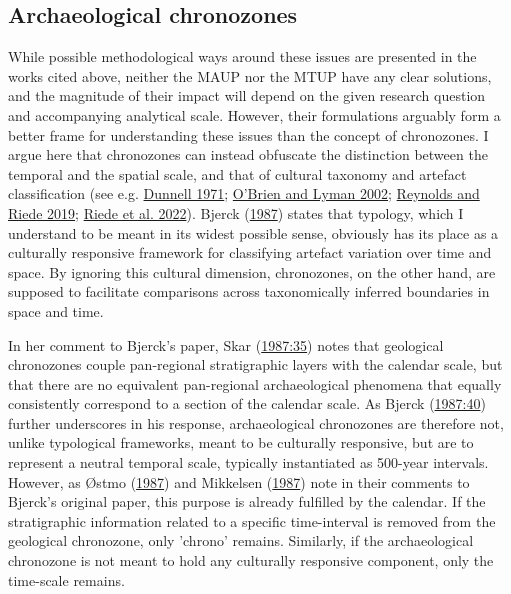\documentclass[
  12pt,
  a4paper,
  oneside]{book}
\begin{document}
\hypertarget{archaeological-chronozones}{%
\subsection{Archaeological chronozones}\label{archaeological-chronozones}}

While possible methodological ways around these issues are presented in the works cited above, neither the MAUP nor the MTUP have any clear solutions, and the magnitude of their impact will depend on the given research question and accompanying analytical scale. However, their formulations arguably form a better frame for understanding these issues than the concept of chronozones. I argue here that chronozones can instead obfuscate the distinction between the temporal and the spatial scale, and that of cultural taxonomy and artefact classification (see e.g. \protect\hyperlink{ref-dunnell1971}{Dunnell 1971}; \protect\hyperlink{ref-obrien2002}{O'Brien and Lyman 2002}; \protect\hyperlink{ref-reynolds2019}{Reynolds and Riede 2019}; \protect\hyperlink{ref-riede2022}{Riede et al. 2022}). Bjerck (\protect\hyperlink{ref-bjerck1987}{1987}) states that typology, which I understand to be meant in its widest possible sense, obviously has its place as a culturally responsive framework for classifying artefact variation over time and space. By ignoring this cultural dimension, chronozones, on the other hand, are supposed to facilitate comparisons across taxonomically inferred boundaries in space and time.

In her comment to Bjerck's paper, Skar (\protect\hyperlink{ref-skar1987}{1987:35}) notes that geological chronozones couple pan-regional stratigraphic layers with the calendar scale, but that there are no equivalent pan-regional archaeological phenomena that equally consistently correspond to a section of the calendar scale. As Bjerck (\protect\hyperlink{ref-bjerck1987}{1987:40}) further underscores in his response, archaeological chronozones are therefore not, unlike typological frameworks, meant to be culturally responsive, but are to represent a neutral temporal scale, typically instantiated as 500-year intervals. However, as Østmo (\protect\hyperlink{ref-uxf8stmo1987}{1987}) and Mikkelsen (\protect\hyperlink{ref-mikkelsen1987}{1987}) note in their comments to Bjerck's original paper, this purpose is already fulfilled by the calendar. If the stratigraphic information related to a specific time-interval is removed from the geological chronozone, only 'chrono' remains. Similarly, if the archaeological chronozone is not meant to hold any culturally responsive component, only the time-scale remains.
\end{document}
